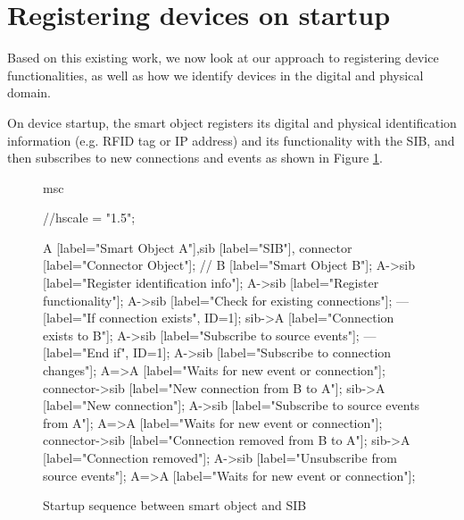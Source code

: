 



\section{Registering devices on startup}

Based on this existing work, we now look at our approach to registering device functionalities, as well as how we identify devices in the digital and physical domain.

On device startup, the smart object registers its digital and physical identification information (e.g. RFID tag or IP address) and its functionality with the SIB, and then subscribes to new connections and events as shown in Figure \ref{connectorsibSequence}.


\begin{figure}[bth]
\begin{msc}
msc {
	//hscale = "1.5";
	
    A [label="Smart Object A"],sib [label="SIB"], connector [label="Connector Object"]; // B [label="Smart Object B"];
	A->sib [label="Register identification info"];
	A->sib [label="Register functionality"];
    A->sib [label="Check for existing connections"];
    --- [label="If connection exists", ID=1];
    sib->A [label="Connection exists to B"];
    A->sib [label="Subscribe to source events"];
    --- [label="End if", ID=1];
    A->sib [label="Subscribe to connection changes"];
    A=>A [label="Waits for new event or connection"];
    connector->sib [label="New connection from B to A"];
    sib->A [label="New connection"];
    A->sib [label="Subscribe to source events from A"];
    A=>A [label="Waits for new event or connection"];
    connector->sib [label="Connection removed from B to A"];
    sib->A [label="Connection removed"];
    A->sib [label="Unsubscribe from source events"];
    A=>A [label="Waits for new event or connection"];
}
\end{msc}
        \caption{Startup sequence between smart object and SIB}
        \label{connectorsibSequence}
\end{figure}

